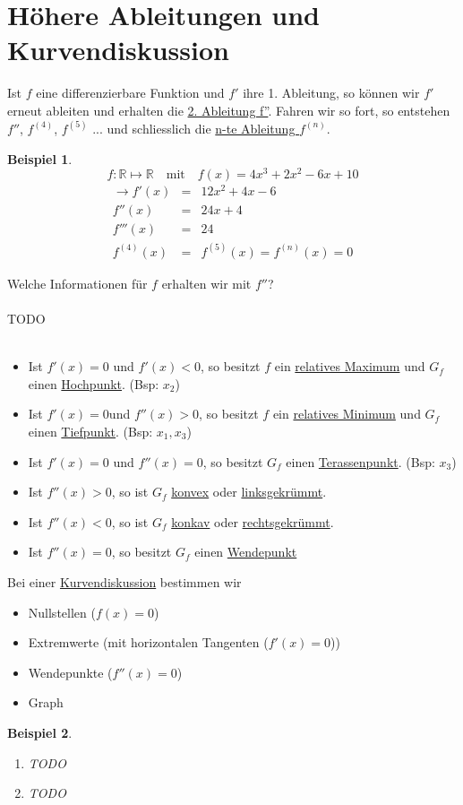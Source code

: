 \documentclass{report}
\newtheorem{myexample}{Beispiel}
\begin{document}
\section{Höhere Ableitungen und Kurvendiskussion}
Ist $f$ eine differenzierbare Funktion und $f'$ ihre 1. Ableitung, so können wir $f'$ erneut ableiten und erhalten die \underline{2. Ableitung f''}. Fahren wir so fort, so entstehen $f''$, $f^{(4)}$, $f^{(5)}$ ... und schliesslich die \underline{n-te Ableitung $f^{(n)}$}.
\begin{myexample}\begin{equation}f: \mathbb{R} \mapsto \mathbb{R} \quad \mbox{mit} \quad f(x) = 4x^3+2x^2 -6x+10\end{equation}
\begin{eqnarray}\to f'(x) & = & 12x^2 + 4x -6 \nonumber \\
f''(x) & = & 24x + 4 \nonumber \\
f'''(x) & = & 24 \nonumber \\
f^{(4)}(x) & = & f^{(5)}(x) = f^{(n)}(x) = 0 
\end{eqnarray}\end{myexample}
Welche Informationen für $f$ erhalten wir mit $f''$?
\\\\TODO\\\\
\begin{itemize}
\item Ist $f'(x) = 0$ und $f'(x) < 0$, so besitzt $f$ ein \underline{relatives Maximum} und $G_f$ einen \underline{Hochpunkt}. (Bsp: $x_2$)
\item Ist $f'(x) = 0$und $f''(x) > 0$, so besitzt $f$ ein \underline{relatives Minimum} und $G_f$ einen \underline{Tiefpunkt}. (Bsp: $x_1, x_3$)
\item Ist $f'(x) = 0$ und $f''(x) = 0$, so besitzt $G_f$ einen \underline{Terassenpunkt}. (Bsp: $x_3$)
\item Ist $f''(x) > 0$, so ist $G_f$ \underline{konvex} oder \underline{linksgekrümmt}.
\item Ist $f''(x) < 0$, so ist $G_f$ \underline{konkav} oder \underline{rechtsgekrümmt}.
\item Ist $f''(x) = 0$, so besitzt $G_f$ einen \underline{Wendepunkt}
\end{itemize}
Bei einer \underline{Kurvendiskussion} bestimmen wir
\begin{itemize}
\item Nullstellen ($f(x) = 0$)
\item Extremwerte (mit horizontalen Tangenten ($f'(x)=0$))
\item Wendepunkte ($f''(x)=0$)
\item Graph
\end{itemize}
\begin{myexample}
\begin{enumerate}
\item TODO
\item TODO\end{enumerate}
\end{myexample}
\end{document}
